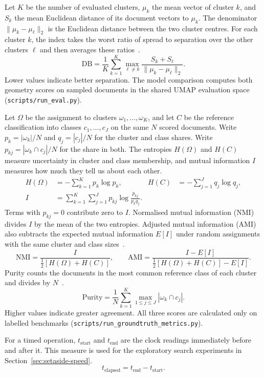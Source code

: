 \begin{description}[leftmargin=1.3em,style=nextline,itemsep=3pt]
\item[Davies--Bouldin index.]
Let $K$ be the number of evaluated clusters, $\mu_k$ the mean vector of cluster $k$, and
$S_k$ the mean Euclidean distance of its document vectors to $\mu_k$. The denominator
$\|\mu_k-\mu_\ell\|_2$ is the Euclidean distance between the two cluster centres.
For each cluster $k$, the index takes the worst ratio of spread to separation over the
other clusters $\ell$ and then averages these ratios~\cite[p.~225]{davies1979cluster}.
\[
  \mathrm{DB}=\frac{1}{K}\sum_{k=1}^{K}
  \max_{\ell\ne k}\frac{S_k+S_\ell}{\|\mu_k-\mu_\ell\|_2}.
\]
Lower values indicate better separation. The model comparison computes both geometry
scores on sampled documents in the shared UMAP evaluation space
(\texttt{scripts/run\_eval.py}).

\item[Agreement with reference labels.]
Let $\Omega$ be the assignment to clusters $\omega_1,\ldots,\omega_K$, and let $C$ be
the reference classification into classes $c_1,\ldots,c_J$ on the same $N$ scored
documents. Write $p_k=|\omega_k|/N$ and $q_j=|c_j|/N$ for the cluster and class shares.
Write $p_{kj}=|\omega_k\cap c_j|/N$ for the share in both. The entropies $H(\Omega)$
and $H(C)$ measure uncertainty in cluster and class membership, and mutual information
$I$ measures how much they tell us about each other.
\[
\begin{aligned}
  H(\Omega)&=-\sum_{k=1}^{K}p_k\log p_k,&
  H(C)&=-\sum_{j=1}^{J}q_j\log q_j,\\
  I&=\sum_{k=1}^{K}\sum_{j=1}^{J}p_{kj}\log\frac{p_{kj}}{p_kq_j}. &&
\end{aligned}
\]
Terms with $p_{kj}=0$ contribute zero to $I$. Normalised mutual information (NMI)
divides $I$ by the mean of the two entropies. Adjusted mutual information (AMI) also
subtracts the expected mutual information $E[I]$ under random assignments with the
same cluster and class sizes~\cite[Table~2, p.~2841 and Sec.~4.1]{vinh2010information}.
\[
  \mathrm{NMI}=\frac{I}{\tfrac12[H(\Omega)+H(C)]},\qquad
  \mathrm{AMI}=\frac{I-E[I]}{\tfrac12[H(\Omega)+H(C)]-E[I]}.
\]
Purity counts the documents in the most common reference class of each cluster and
divides by $N$~\cite[Eq.~(16.1), p.~357]{manning2008ir}.
\begin{equation}
  \mathrm{Purity}=\frac{1}{N}\sum_{k=1}^{K}\max_{1\le j\le J}|\omega_k\cap c_j|.
  \label{eq:benchmark-purity}
\end{equation}
Higher values indicate greater agreement. All three scores are calculated only on
labelled benchmarks (\texttt{scripts/run\_groundtruth\_metrics.py}).

\item[Elapsed time.]
For a timed operation, $t_{\mathrm{start}}$ and $t_{\mathrm{end}}$ are the clock
readings immediately before and after it. This measure is used for the exploratory
search experiments in Section~\ref{sec:setaside-speed}.
\[
  t_{\mathrm{elapsed}}=t_{\mathrm{end}}-t_{\mathrm{start}}.
\]
\end{description}

